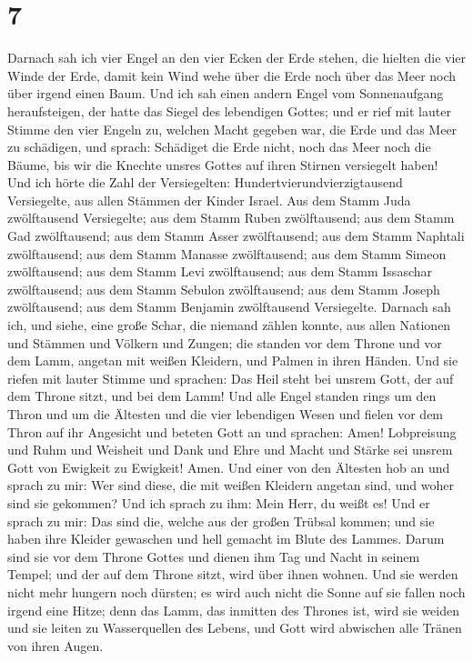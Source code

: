 \hypertarget{section-6}{%
\section{7}\label{section-6}}

 Darnach sah ich vier Engel an den vier Ecken der Erde
stehen, die hielten die vier Winde der Erde, damit kein Wind wehe über
die Erde noch über das Meer noch über irgend einen Baum. 
Und ich sah einen andern Engel vom Sonnenaufgang heraufsteigen, der
hatte das Siegel des lebendigen Gottes; und er rief mit lauter Stimme
den vier Engeln zu, welchen Macht gegeben war, die Erde und das Meer zu
schädigen,  und sprach: Schädiget die Erde nicht, noch das
Meer noch die Bäume, bis wir die Knechte unsres Gottes auf ihren Stirnen
versiegelt haben!  Und ich hörte die Zahl der
Versiegelten: Hundertvierundvierzigtausend Versiegelte, aus allen
Stämmen der Kinder Israel.  Aus dem Stamm Juda
zwölftausend Versiegelte; aus dem Stamm Ruben zwölftausend; aus dem
Stamm Gad zwölftausend;  aus dem Stamm Asser zwölftausend;
aus dem Stamm Naphtali zwölftausend; aus dem Stamm Manasse zwölftausend;
 aus dem Stamm Simeon zwölftausend; aus dem Stamm Levi
zwölftausend; aus dem Stamm Issaschar zwölftausend;  aus
dem Stamm Sebulon zwölftausend; aus dem Stamm Joseph zwölftausend; aus
dem Stamm Benjamin zwölftausend Versiegelte.  Darnach sah
ich, und siehe, eine große Schar, die niemand zählen konnte, aus allen
Nationen und Stämmen und Völkern und Zungen; die standen vor dem Throne
und vor dem Lamm, angetan mit weißen Kleidern, und Palmen in ihren
Händen.  Und sie riefen mit lauter Stimme und sprachen:
Das Heil steht bei unsrem Gott, der auf dem Throne sitzt, und bei dem
Lamm!  Und alle Engel standen rings um den Thron und um
die Ältesten und die vier lebendigen Wesen und fielen vor dem Thron auf
ihr Angesicht und beteten Gott an  und sprachen: Amen!
Lobpreisung und Ruhm und Weisheit und Dank und Ehre und Macht und Stärke
sei unsrem Gott von Ewigkeit zu Ewigkeit! Amen.  Und
einer von den Ältesten hob an und sprach zu mir: Wer sind diese, die mit
weißen Kleidern angetan sind, und woher sind sie gekommen?
 Und ich sprach zu ihm: Mein Herr, du weißt es! Und er
sprach zu mir: Das sind die, welche aus der großen Trübsal kommen; und
sie haben ihre Kleider gewaschen und hell gemacht im Blute des Lammes.
 Darum sind sie vor dem Throne Gottes und dienen ihm Tag
und Nacht in seinem Tempel; und der auf dem Throne sitzt, wird über
ihnen wohnen.  Und sie werden nicht mehr hungern noch
dürsten; es wird auch nicht die Sonne auf sie fallen noch irgend eine
Hitze;  denn das Lamm, das inmitten des Thrones ist, wird
sie weiden und sie leiten zu Wasserquellen des Lebens, und Gott wird
abwischen alle Tränen von ihren Augen.

